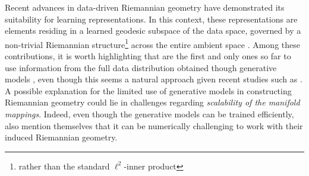 Recent advances in data-driven Riemannian geometry have demonstrated its suitability for learning representations.
In this context, these representations are elements residing in a learned geodesic subspace of the data space, governed by a non-trivial Riemannian structure\footnote{rather than the standard $\ell^2$-inner product} across the entire ambient space \cite{arvanitidis2016locally,diepeveen2024pulling,hauberg2012geometric,peltonen2004improved,Scarvelis2023,sorrenson2024learningdistancesdatanormalizing,sun2024geometryaware}. 
Among these contributions, it is worth highlighting that \cite{sorrenson2024learningdistancesdatanormalizing} are the first and only ones so far to use information from the full data distribution obtained though generative models \cite{dinh2017density,song2020score}, even though this seems a natural approach given recent studies such as \cite{sakamoto2024the,stanczuk2022your}. A possible explanation for the limited use of generative models in constructing Riemannian geometry could lie in challenges regarding \emph{scalability of the manifold mappings}. Indeed, even though the generative models can be trained efficiently, \cite{sorrenson2024learningdistancesdatanormalizing} also mention themselves that it can be numerically challenging to work with their induced Riemannian geometry.

